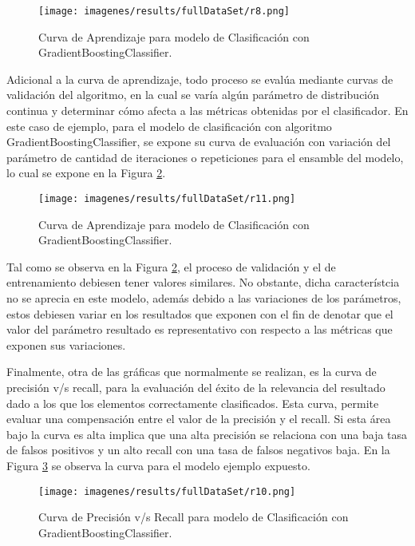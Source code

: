 \begin{figure}[!h]
	\centering
	\texttt{[image: imagenes/results/fullDataSet/r8.png]}
	\caption{Curva de Aprendizaje para modelo de Clasificaci\'on con GradientBoostingClassifier.}
	\label{res8}
\end{figure}

 Adicional a la curva de aprendizaje, todo proceso se eval\'ua mediante curvas de validaci\'on del algoritmo, en la cual se var\'ia alg\'un par\'ametro de distribuci\'on continua y determinar c\'omo afecta a las m\'etricas obtenidas por el clasificador. En este caso de ejemplo, para el modelo de clasificaci\'on con algoritmo GradientBoostingClassifier, se expone su curva de evaluaci\'on con variaci\'on del par\'ametro de cantidad de iteraciones o repeticiones para el ensamble del modelo, lo cual se expone en la Figura \ref{res9}.
 
 \begin{figure}[!h]
 	\centering
 	\texttt{[image: imagenes/results/fullDataSet/r11.png]}
 	\caption{Curva de Aprendizaje para modelo de Clasificaci\'on con GradientBoostingClassifier.}
 	\label{res9}
 \end{figure}
 
Tal como se observa en la Figura \ref{res9}, el proceso de validaci\'on y el de entrenamiento debiesen tener valores similares. No obstante, dicha caracter\'istcia no se aprecia en este modelo, adem\'as debido a las variaciones de los par\'ametros, estos debiesen variar en los resultados que exponen con el fin de denotar que el valor del par\'ametro resultado es representativo con respecto a las m\'etricas que exponen sus variaciones.

Finalmente, otra de las gr\'aficas que normalmente se realizan, es la curva de precisi\'on v/s recall, para la evaluaci\'on del \'exito de la relevancia del resultado dado a los que los elementos correctamente clasificados. Esta curva, permite evaluar una compensaci\'on entre el valor de la precisi\'on y el recall. Si esta \'area bajo la curva es alta implica que una alta precisi\'on se relaciona con una baja tasa de falsos positivos y un alto recall con una tasa de falsos negativos baja. En la Figura \ref{res10} se observa la curva para el modelo ejemplo expuesto.


\begin{figure}[!h]
	\centering
	\texttt{[image: imagenes/results/fullDataSet/r10.png]}
	\caption{Curva de Precisi\'on v/s Recall para modelo de Clasificaci\'on con GradientBoostingClassifier.}
	\label{res10}
\end{figure}

